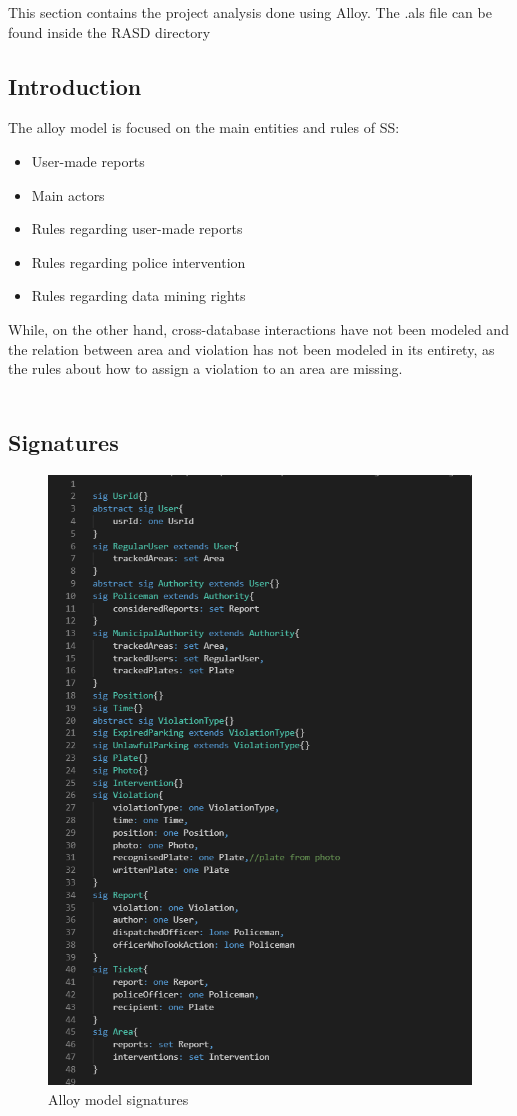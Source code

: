 

This section contains the project analysis done using Alloy. The .als file can be found inside the RASD directory \\
\subsection{Introduction}
The alloy model is focused on the main entities and rules of SS:
\begin{itemize}
	\item User-made reports
	\item Main actors
	\item Rules regarding user-made reports
	\item Rules regarding police intervention
	\item Rules regarding data mining rights
\end{itemize}
While, on the other hand, cross-database interactions have not been modeled and the relation between area and violation has not been modeled in its entirety, as the rules about how to assign a violation to an area are missing.\\  
\\
\newpage
\subsection{Signatures}
\begin{figure}[h!]
	\includegraphics[scale=0.85 ]{Images/Signatures_1-2}
	\caption{Alloy model signatures}
\end{figure}
\newpage
